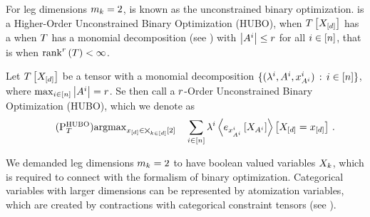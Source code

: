 
For leg dimensions $m_{k}=2$,  is known as the unconstrained binary optimization.
 is a Higher-Order Unconstrained Binary Optimization (HUBO), when $T\left[X_{[d]}\right]$ has a when $T$ has a monomial decomposition (see ) with $\left|A^{i}\right|\leq r$ for all $i\in[n]$, that is when $\mathrm{rank}^{r}\left(T\right)<\infty$.

\begin{definition}
    Let $T\left[X_{[d]}\right]$ be a tensor with a monomial decomposition $\{(\lambda^{i}, A^{i}, x_{A^{i}}^{i}) \, : \, i\in[n]\}$, where $\max_{i\in[n]}\left|A^{i}\right|=r$.
    Se then call  a $r$-Order Unconstrained Binary Optimization (HUBO), which we denote as
    \begin{align}
        \tag{$\probtagtypeinst{\mathrm{HUBO}}{\hypercore}$}\label{prob:HUBO}
        \argmax_{\shortcatindices\in\atomstates} \quad
        \sum_{\decindexin} \slicescalar^{\decindex} \contractionof{\onehotmapofat{\catindexof{\variablesetof{\decindex}}^{\decindex}}{\catvariableof{\variablesetof{\decindex}}}}{\indexedshortcatvariables} \, .
    \end{align}
\end{definition}

\begin{remark}
    We demanded leg dimensions $m_{k}=2$ to have boolean valued variables $X_{k}$, which is required to connect with the formalism of binary optimization.
    Categorical variables with larger dimensions can be represented by atomization variables, which are created by contractions with categorical constraint tensors (see ).
\end{remark}

